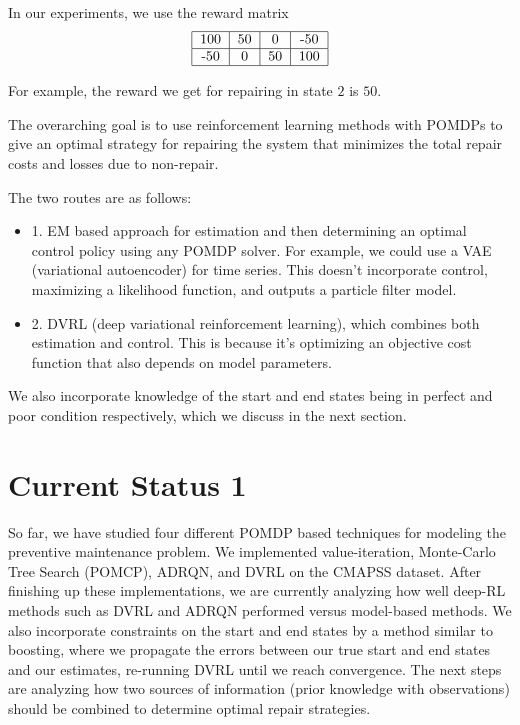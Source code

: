 \documentclass[english]{article}
\numberwithin{equation}{section}
\begin{document}
	In our experiments, we use the reward matrix
	$$
	 \begin{tabular}{|c|c|c|c|}
	 	\hline 
	 	100 & 50 & 0 & -50  \\ 
	 	\hline 
	 	-50 & 0 & 50 & 100 \\ 
	 	\hline 
	 \end{tabular}
	 $$
	 
	 For example, the reward we get for repairing in state $2$ is $50$.
	
	The overarching goal is to use reinforcement learning methods with POMDPs to give an optimal strategy for repairing the system that minimizes the total repair costs and losses due to non-repair.
	
	The two routes are as follows:
	\begin{itemize}
		\item 1. EM based approach for estimation and then determining an optimal control policy using any POMDP solver. For example, we could use a VAE (variational autoencoder) for time series. This doesn't incorporate control, maximizing a likelihood function, and outputs a particle filter model.
		\item 2. DVRL (deep variational reinforcement learning), which combines both estimation and control. This is because it's optimizing an objective cost function that also depends on model parameters.
	\end{itemize}
	
	We also incorporate knowledge of the start and end states being in perfect and poor condition respectively, which we discuss in the next section.
	
	\section*{Current Status 1}
	
	So far, we have studied four different POMDP based techniques for modeling the preventive maintenance problem. We implemented value-iteration, Monte-Carlo Tree Search (POMCP), ADRQN, and DVRL on the CMAPSS dataset. After finishing up these implementations, we are currently analyzing how well deep-RL methods such as DVRL and ADRQN performed versus model-based methods. We also incorporate constraints on the start and end states by a method similar to boosting, where we propagate the errors between our true start and end states and our estimates, re-running DVRL until we reach convergence. The next steps are analyzing how two sources of information (prior knowledge with observations) should be combined to determine optimal repair strategies.
	
\end{document}

